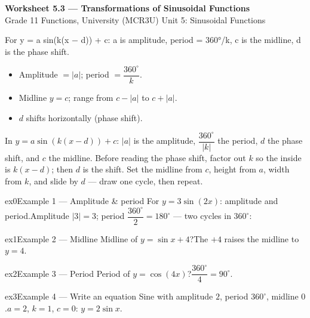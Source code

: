 \documentclass[11pt]{article}
\begin{document}
\begin{center}
{\LARGE\bfseries\color{titleblue}Worksheet 5.3 --- Transformations of Sinusoidal Functions}\\[2pt]
{\small Grade 11 Functions, University (MCR3U) \textperiodcentered{} Unit 5: Sinusoidal Functions}
\end{center}

\begin{ideabox}
For y = a sin(k(x − d)) + c: a is amplitude, period = 360°/k, c is the midline, d is the phase shift.
\begin{itemize}[leftmargin=*,itemsep=2pt]
  \item Amplitude $=|a|$; period $=\dfrac{360^\circ}{k}$.
  \item Midline $y=c$; range from $c-|a|$ to $c+|a|$.
  \item $d$ shifts horizontally (phase shift).
\end{itemize}
\end{ideabox}

\begin{learnbox}
In $y=a\sin\!\left(k(x-d)\right)+c$: $|a|$ is the amplitude, $\dfrac{360^\circ}{|k|}$ the period, $d$ the phase shift, and $c$ the midline.
Before reading the phase shift, factor out $k$ so the inside is $k(x-d)$; then $d$ is the shift.
Set the midline from $c$, height from $a$, width from $k$, and slide by $d$ — draw one cycle, then repeat.
\end{learnbox}


\begin{example}{ex0}{Example 1 --- Amplitude \& period}
For $y=3\sin(2x)$: amplitude and period.\soln Amplitude $|3|=3$; period $\dfrac{360^\circ}{2}=180^\circ$ — two cycles in $360^\circ$:
\end{example}

\begin{example}{ex1}{Example 2 --- Midline}
Midline of $y=\sin x+4$?\soln The $+4$ raises the midline to $y=4$.
\end{example}

\begin{example}{ex2}{Example 3 --- Period}
Period of $y=\cos(4x)$?\soln $\dfrac{360^\circ}{4}=90^\circ$.
\end{example}

\begin{example}{ex3}{Example 4 --- Write an equation}
Sine with amplitude $2$, period $360^\circ$, midline $0$.\soln $a=2$, $k=1$, $c=0$: $y=2\sin x$.
\end{example}
\end{document}
